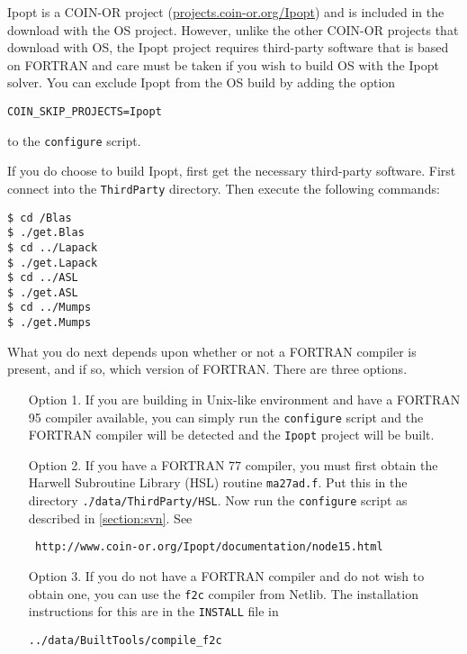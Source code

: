 \documentclass[11pt]{article}
\renewcommand{\_}{{\char"5F}}
\renewcommand{\{}{{\char"7B}}
\renewcommand{\}}{{\char"7D}}
\renewcommand{\^}{{\char"0D}}
\renewcommand{\'}{{\char"0D}}
\begin{document}
Ipopt is a COIN-OR project (\url{projects.coin-or.org/Ipopt}) and is included in the download with the OS project. However, unlike the other COIN-OR projects that download with OS, the Ipopt project requires third-party software that is based on FORTRAN and care must be taken if you wish to build OS with the  Ipopt solver.  You can  exclude Ipopt from the OS  build by adding the option

\begin{verbatim}
COIN_SKIP_PROJECTS=Ipopt
\end{verbatim}
to the {\tt configure} script.


If you do choose to build Ipopt, first get the necessary third-party software.  First connect into the {\tt ThirdParty} directory. Then execute the following commands:

\begin{verbatim}
$ cd /Blas
$ ./get.Blas
$ cd ../Lapack
$ ./get.Lapack
$ cd ../ASL
$ ./get.ASL
$ cd ../Mumps
$ ./get.Mumps
\end{verbatim}

What you do next depends upon whether or not a FORTRAN compiler is present, and if so, which version of FORTRAN.  There are three options.

\begin{itemize}

\item[Option 1.]   If you are building in Unix-like environment and have a FORTRAN 95 compiler available, you can simply run the {\tt configure} script and the FORTRAN compiler will be detected and the {\tt Ipopt} project will be built.

\item[Option 2.]   If you have a FORTRAN 77 compiler, you  must first obtain the  Harwell Subroutine Library (HSL) routine {\tt ma27ad.f}.  Put this in the directory {\tt \../data/ThirdParty/HSL}.  Now run the {\tt configure} script as described in \ref{section:svn}.  See

\begin{verbatim}
 http://www.coin-or.org/Ipopt/documentation/node15.html
 \end{verbatim}

\item[Option 3.]  If you do not have a FORTRAN compiler and do not wish to obtain one, you can use the {\tt f2c} compiler from Netlib.  The installation instructions for this are in the {\tt INSTALL} file in
\begin{verbatim}
../data/BuiltTools/compile_f2c
\end{verbatim}

\end{itemize}
\end{document}
